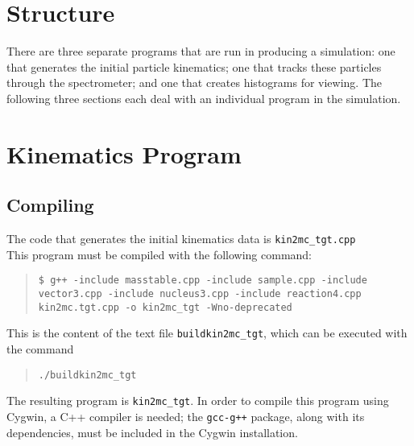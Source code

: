 \section*{Structure}
There are three separate programs that are run in producing a simulation: one that generates the initial particle kinematics; one that tracks these particles through the spectrometer; and one that creates histograms for viewing.  The following three sections each deal with an individual program in the simulation. 
\section{Kinematics Program}
\subsection{Compiling}
The code that generates the initial kinematics data is \verb|kin2mc_tgt.cpp|\\
This program must be compiled with the following command: 
\begin{quote}
\texttt{{\color{green}\$} g++ -include masstable.cpp -include sample.cpp -include vector3.cpp -include nucleus3.cpp -include reaction4.cpp kin2mc.tgt.cpp -o kin2mc\_tgt -Wno-deprecated}
\end{quote}
This is the content of the text file \verb|buildkin2mc_tgt|, which can be executed with the command
\begin{quote}
\begin{Verbatim}
./buildkin2mc_tgt
\end{Verbatim}
\end{quote}
The resulting program is \verb|kin2mc_tgt|.  In order to compile this program using Cygwin, a C++ compiler is needed; the \texttt{gcc-g++} package, along with its dependencies, must be included in the Cygwin installation. %

